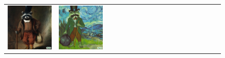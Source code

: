 \begin{figure}[ht!]
\begin{adjustwidth}{-0.8in}{-0.5in}
\begin{tabular}{cccccccccccccccccccc}
\multicolumn{2}{c}{\includegraphics[width=\threebythreecolwidth\textwidth]{figures/cherries/rembrandt.jpg}} &
\multicolumn{2}{c}{\includegraphics[width=\threebythreecolwidth\textwidth]{figures/cherries/vangogh.jpg}} &

\end{tabular}
\end{adjustwidth}
\end{figure}
